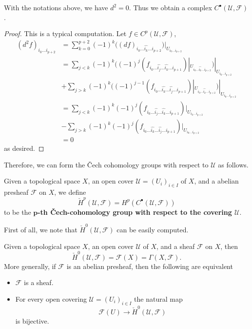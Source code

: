 \begin{proposition}
With the notations above, we have $d^2=0$. Thus we obtain a complex $C^\bullet(\mathcal{U},\mathscr{F})$.
\end{proposition}
\begin{proof}
This is a typical computation. Let $f\in C^p(\mathcal{U},\mathscr{F})$,
\begin{align*}
(d^2f)_{i_0\dots i_{p+2}}&=\sum_{k=0}^{p+2}(-1)^k\big((df)_{i_0\dots\widehat{i_k}\dots i_{p+2}}\big)|_{U_{i_0\dots i_{p+2}}}\\
&=\sum_{j<k}(-1)^k\big((-1)^j(f_{i_0\dots\widehat{i_j}\dots\widehat{i_k}\dots i_{p+1}})|_{U_{i_0\dots\widehat{i_k}\dots i_{p+2}}}\big)|_{U_{i_0\dots i_{p+2}}}\\
&+\sum_{j>k}(-1)^k\big((-1)^{j-1}(f_{i_0\dots\widehat{i_k}\dots\widehat{i_j}\dots i_{p+1}})|_{U_{i_0\dots\widehat{i_k}\dots i_{p+2}}}\big)|_{U_{i_0\dots i_{p+2}}}\\
&=\sum_{j<k}(-1)^k(-1)^j(f_{i_0\dots\widehat{i_j}\dots\widehat{i_k}\dots i_{p+1}})|_{U_{i_0\dots i_{p+2}}}\\
&-\sum_{j>k}(-1)^k(-1)^{j}(f_{i_0\dots\widehat{i_k}\dots\widehat{i_j}\dots i_{p+1}})|_{U_{i_0\dots i_{p+2}}}\\
&=0
\end{align*}
as desired.
\end{proof}
Therefore, we can form the \v{C}ech cohomology groups with respect to $\mathcal{U}$ as follows.
\begin{definition}
Given a topological space $X$, an open cover $\mathcal{U}=(U_{i})_{i\in I}$ of $X$, and a abelian presheaf $\mathscr{F}$ on $X$, we define
\[\check{H}^p(\mathcal{U},\mathscr{F})=H^p(C^\bullet(\mathcal{U},\mathscr{F}))\]
to be the \textbf{$\bm{p}$-th \v{C}ech-cohomology group with respect to the covering $\mathcal{U}$}.
\end{definition}
First of all, we note that $\check{H}^0(\mathcal{U},\mathscr{F})$ can be easily computed.
\begin{proposition}\label{Cech H^0}
Given a topological space $X$, an open cover $\mathcal{U}$ of $X$, and a sheaf $\mathscr{F}$ on $X$, then
\[\check{H}^0(\mathcal{U},\mathscr{F})=\mathscr{F}(X)=\Gamma(X,\mathscr{F}).\]
More generally, if $\mathscr{F}$ is an abelian presheaf, then the following
are equivalent
\begin{itemize}
\item $\mathscr{F}$ is a sheaf.
\item For every open covering $\mathcal{U}=(U_i)_{i\in I}$ the natural map
\[\mathscr{F}(U)\to\check{H}^0(\mathcal{U},\mathscr{F})\]
is bijective.
\end{itemize}
\end{proposition}
